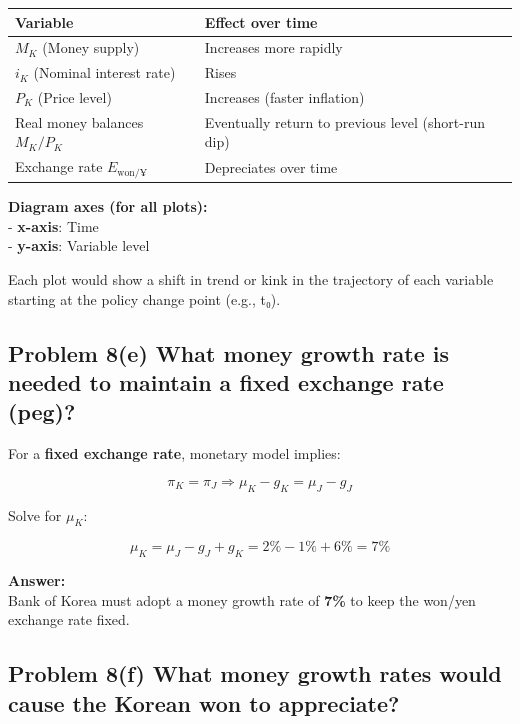 \documentclass[
]{article}
\begin{document}
\begin{longtable}[]{@{}
  >{\raggedright\arraybackslash}p{}
  >{\raggedright\arraybackslash}p{}@{}}
\toprule\noalign{}
\begin{minipage}[b]{\linewidth}\raggedright
Variable
\end{minipage} & \begin{minipage}[b]{\linewidth}\raggedright
Effect over time
\end{minipage} \\
\midrule\noalign{}
\endhead
\bottomrule\noalign{}
\endlastfoot
\(M_K\) (Money supply) & Increases more rapidly \\
\(i_K\) (Nominal interest rate) & Rises \\
\(P_K\) (Price level) & Increases (faster inflation) \\
Real money balances \(M_K/P_K\) & Eventually return to previous level
(short-run dip) \\
Exchange rate \(E_{\text{won}/¥}\) & Depreciates over time \\
\end{longtable}

\textbf{Diagram axes (for all plots):}\\
- \textbf{x-axis}: Time\\
- \textbf{y-axis}: Variable level

Each plot would show a shift in trend or kink in the trajectory of each
variable starting at the policy change point (e.g., t₀).

\subsection{Problem 8(e) What money growth rate is needed to maintain a
fixed exchange rate
(peg)?}\label{problem-8e-what-money-growth-rate-is-needed-to-maintain-a-fixed-exchange-rate-peg}

For a \textbf{fixed exchange rate}, monetary model implies:

\[
\pi_K = \pi_J \Rightarrow \mu_K - g_K = \mu_J - g_J
\]

Solve for \(\mu_K\):

\[
\mu_K = \mu_J - g_J + g_K = 2\% - 1\% + 6\% = 7\%
\]

\textbf{Answer:}\\
Bank of Korea must adopt a money growth rate of \textbf{7\%} to keep the
won/yen exchange rate fixed.

\subsection{Problem 8(f) What money growth rates would cause the Korean
won to
appreciate?}\label{problem-8f-what-money-growth-rates-would-cause-the-korean-won-to-appreciate}
\end{document}
